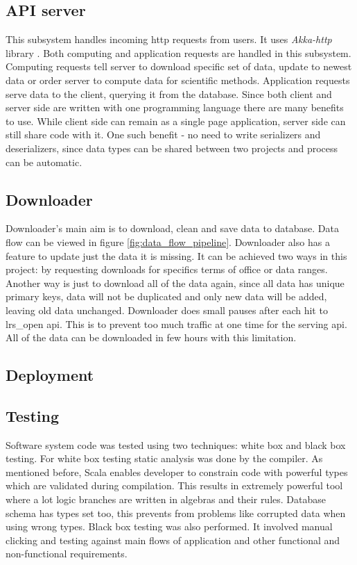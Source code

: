 \documentclass[a4paper,12pt]{article}
\begin{document}
	\subsection{API server}
	
	This subsystem handles incoming \gls{http} requests from users. It uses \textit{Akka-http} library \cite{akka_http}. Both computing and application requests are handled in this subsystem. Computing requests tell server to download specific set of data, update to newest data or order server to compute data for scientific methods. Application requests serve data to the client, querying it from the database. Since both client and server side are written with one programming language there are many benefits to use. While client side can remain as a single page application, server side can still share code with it. One such benefit - no need to write serializers and deserializers, since data types can be shared between two projects and process can be automatic. 
	
	\subsection{Downloader}
	
	Downloader's main aim is to download, clean and save data to database. Data flow can be viewed in figure \ref{fig:data_flow_pipeline}. Downloader also has a feature to update just the data it is missing. It can be achieved two ways in this project: by requesting downloads for specifics terms of office or data ranges. Another way is just to download all of the data again, since all data has unique primary keys, data will not be duplicated and only new data will be added, leaving old data unchanged. Downloader does small pauses after each hit to \gls{lrs_open} \acrshort{api}. This is to prevent too much traffic at one time for the serving \acrshort{api}. All of the data can be downloaded in few hours with this limitation.
	
	\subsection{Deployment}
	
 	\subsection{Testing}
 	
 	Software system code was tested using two techniques: white box and black box testing. For white box testing static analysis was done by the compiler. As mentioned before, Scala enables developer to constrain code with powerful types which are validated during compilation. This results in extremely powerful tool where a lot logic branches are written in algebras and their rules. Database schema has types set too, this prevents from problems like corrupted data when using wrong types. Black box testing was also performed. It involved manual clicking and testing against main flows of application and other functional and non-functional requirements. 
 	
\end{document}

